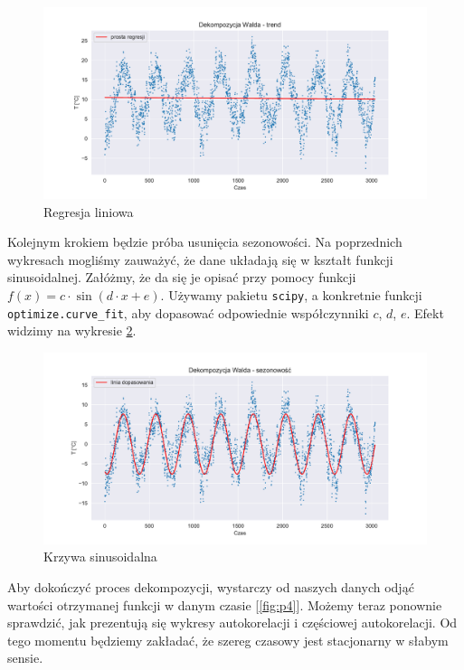 \documentclass{article}
\theoremstyle{break}
\newcommand{\code}[1]{\colorbox{light-gray}{\texttt{#1}}}
\begin{document}
	\begin{figure}[H]
		\begin{center}
			\includegraphics[scale=0.63]{plot2.pdf}
			\caption{Regresja liniowa}
			\label{fig:p2}
		\end{center}
	\end{figure}

\newpage
	
	Kolejnym krokiem będzie próba usunięcia sezonowości. Na poprzednich wykresach mogliśmy zauważyć, że dane układają się w kształt funkcji sinusoidalnej. Załóżmy, że da się je opisać przy pomocy funkcji $f(x) = c\cdot\sin(d\cdot x+e)$. Używamy pakietu \code{scipy}, a konkretnie funkcji \code{optimize.curve\_fit}, aby dopasować odpowiednie współczynniki $c$, $d$, $e$. Efekt widzimy na wykresie \ref{fig:p3}.
	
	\begin{figure}[H]
		\begin{center}
			\includegraphics[scale=0.5]{plot3.pdf}
			\caption{Krzywa sinusoidalna}
			\label{fig:p3}
		\end{center}
	\end{figure}
	
	Aby dokończyć proces dekompozycji, wystarczy od naszych danych odjąć wartości otrzymanej funkcji w danym czasie [\ref{fig:p4}]. Możemy teraz ponownie sprawdzić, jak prezentują się wykresy autokorelacji i częściowej autokorelacji. Od tego momentu będziemy zakładać, że szereg czasowy jest stacjonarny w słabym sensie.
	
\end{document}
